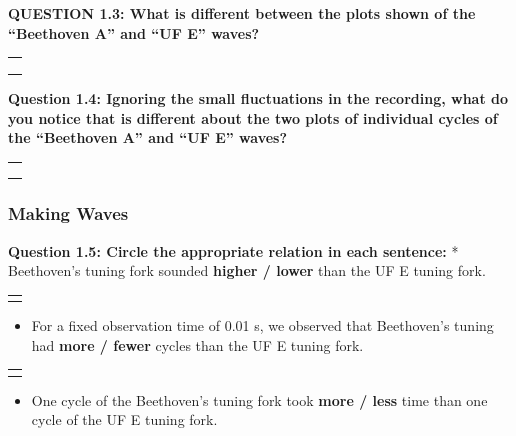 \documentclass[11pt]{article}
\providecommand{\tightlist}{%
      \setlength{\itemsep}{0pt}\setlength{\parskip}{0pt}}
\begin{document}
\textbf{QUESTION 1.3: What is different between the plots shown of the
``Beethoven A'' and ``UF E'' waves?}

\begin{longtable}[]{@{}l@{}}
\toprule
 \\
\midrule
\endhead
 \\
 \\
 \\
\bottomrule
\end{longtable}

\textbf{Question 1.4: Ignoring the small fluctuations in the recording,
what do you notice that is different about the two plots of individual
cycles of the ``Beethoven A'' and ``UF E'' waves?}

\begin{longtable}[]{@{}l@{}}
\toprule
 \\
\midrule
\endhead
 \\
 \\
 \\
\bottomrule
\end{longtable}

\newpage
\hypertarget{making-waves}{%
\subsubsection*{Making Waves}\label{making-waves}}

\textbf{Question 1.5: Circle the appropriate relation in each sentence:}
* Beethoven's tuning fork sounded \textbf{higher / lower} than the UF E
tuning fork.

\begin{longtable}[]{@{}l@{}}
\toprule
 \\
\midrule
\endhead
 \\
\bottomrule
\end{longtable}

\begin{itemize}
\tightlist
\item
  For a fixed observation time of 0.01 s, we observed that Beethoven's
  tuning had \textbf{more / fewer} cycles than the UF E tuning fork.
\end{itemize}

\begin{longtable}[]{@{}l@{}}
\toprule
 \\
\midrule
\endhead
 \\
\bottomrule
\end{longtable}

\begin{itemize}
\tightlist
\item
  One cycle of the Beethoven's tuning fork took \textbf{more / less}
  time than one cycle of the UF E tuning fork.
\end{itemize}
\end{document}
